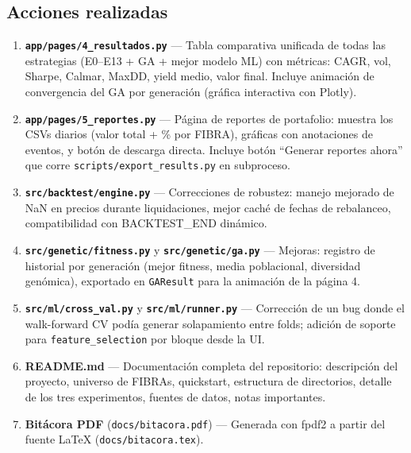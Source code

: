 \documentclass[12pt, a4paper]{article}
\begin{document}
\subsection{Acciones realizadas}

\begin{enumerate}

  \item \textbf{\texttt{app/pages/4\_resultados.py}} --- Tabla comparativa unificada de todas las estrategias (E0--E13 + GA + mejor modelo ML) con m\'{e}tricas: CAGR, vol, Sharpe, Calmar, MaxDD, yield medio, valor final. Incluye animaci\'{o}n de convergencia del GA por generaci\'{o}n (gr\'{a}fica interactiva con Plotly).

  \item \textbf{\texttt{app/pages/5\_reportes.py}} --- P\'{a}gina de reportes de portafolio: muestra los CSVs diarios (valor total + \% por FIBRA), gr\'{a}ficas con anotaciones de eventos, y bot\'{o}n de descarga directa. Incluye bot\'{o}n ``Generar reportes ahora'' que corre \texttt{scripts/export\_results.py} en subproceso.

  \item \textbf{\texttt{src/backtest/engine.py}} --- Correcciones de robustez: manejo mejorado de NaN en precios durante liquidaciones, mejor cach\'{e} de fechas de rebalanceo, compatibilidad con BACKTEST\_END din\'{a}mico.

  \item \textbf{\texttt{src/genetic/fitness.py}} y \textbf{\texttt{src/genetic/ga.py}} --- Mejoras: registro de historial por generaci\'{o}n (mejor fitness, media poblacional, diversidad gen\'{o}mica), exportado en \texttt{GAResult} para la animaci\'{o}n de la p\'{a}gina 4.

  \item \textbf{\texttt{src/ml/cross\_val.py}} y \textbf{\texttt{src/ml/runner.py}} --- Correcci\'{o}n de un bug donde el walk-forward CV pod\'{i}a generar solapamiento entre folds; adici\'{o}n de soporte para \texttt{feature\_selection} por bloque desde la UI.

  \item \textbf{README.md} --- Documentaci\'{o}n completa del repositorio: descripci\'{o}n del proyecto, universo de FIBRAs, quickstart, estructura de directorios, detalle de los tres experimentos, fuentes de datos, notas importantes.

  \item \textbf{Bit\'{a}cora PDF} (\texttt{docs/bitacora.pdf}) --- Generada con fpdf2 a partir del fuente LaTeX (\texttt{docs/bitacora.tex}).

\end{enumerate}
\end{document}
